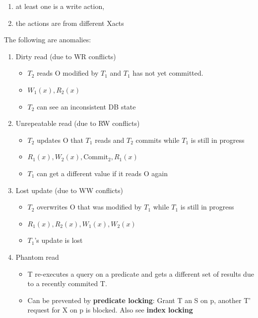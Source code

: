 \documentclass[10pt, landscape]{article}
\begin{document}
\begin{multicols*}{4}
  \begin{enumerate}
    \item at least one is a write action,
    \item the actions are from different Xacts 
  \end{enumerate}

  The following are anomalies:
  
  \begin{enumerate}
    \item Dirty read (due to WR conflicts)
    \begin{itemize}
      \item $T_2$ reads O modified by $T_1$ and $T_1$ has not yet committed.
      \item $W_1(x), R_2(x)$
      \item $T_2$ can see an inconsistent DB state 
    \end{itemize}
    \item Unrepeatable read (due to RW conflicts)
    \begin{itemize}
      \item $T_2$ updates O that $T_1$ reads and $T_2$ commits while $T_1$ is still in progress
      \item $R_1(x), W_2(x), \text{Commit}_2, R_1(x)$
      \item $T_1$ can get a different value if it reads O again
    \end{itemize} 
    \item Lost update (due to WW conflicts)
    \begin{itemize}
      \item $T_2$ overwrites O that was modified by $T_1$ while $T_1$ is still in progress
      \item $R_1(x), R_2(x), W_1(x), W_2(x)$
      \item $T_1$'s update is lost
    \end{itemize}
    \item Phantom read
    \begin{itemize}
      \item T re-executes a query on a predicate and gets a different set of results due to a recently commited T.
      \item Can be prevented by \textbf{predicate locking}: Grant T an S on p, another T' request for X on p is blocked. Also see \textbf{index locking}
    \end{itemize}
  \end{enumerate}


\end{multicols*}
\end{document}
